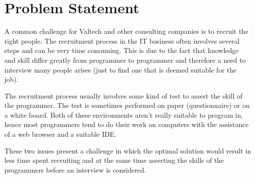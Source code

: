 \section{Problem Statement}
A common challenge for Valtech and other consulting companies is to recruit the right people.  The recruitment process in the IT business often involves several steps and can be very time consuming. This is due to the fact that knowledge and skill differ greatly from programmer to programmer and therefore a need to interview many people arises (just to find one that is deemed suitable for the job). 

The recruitment process usually involves some kind of test to assert the skill of the programmer.  The test is sometimes performed on paper (questionnaire) or on a white board. Both of these environments aren’t really suitable to program in, hence most programmers tend to do their work on computers with the assistance of a web browser and a suitable IDE. 

These two issues present a challenge in which the optimal solution would result in less time spent recruiting and at the same time asserting the skills of the programmers before an interview is considered.